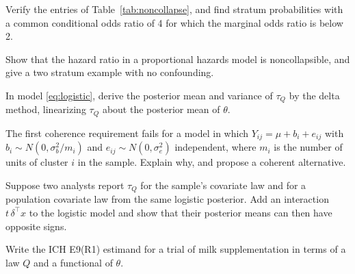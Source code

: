 \begin{exercises}
\item\label{ex:ch02:1} Verify the entries of Table~\ref{tab:noncollapse}, and find stratum probabilities with a common conditional odds ratio of 4 for which the marginal odds ratio is below 2.
\item\label{ex:ch02:2} Show that the hazard ratio in a proportional hazards model is noncollapsible, and give a two stratum example with no confounding.
\item\label{ex:ch02:3} In model \eqref{eq:logistic}, derive the posterior mean and variance of $\tau_Q$ by the delta method, linearizing $\tau_Q$ about the posterior mean of $\theta$.
\item\label{ex:ch02:4} The first coherence requirement fails for a model in which $Y_{ij} = \mu + b_i + e_{ij}$ with $b_i \sim N(0, \sigma_b^2 / m_i)$ and $e_{ij} \sim N(0, \sigma_e^2)$ independent, where $m_i$ is the number of units of cluster $i$ in the sample. Explain why, and propose a coherent alternative.
\item\label{ex:ch02:5} Suppose two analysts report $\tau_Q$ for the sample's covariate law and for a population covariate law from the same logistic posterior. Add an interaction $t\,\delta^\top x$ to the logistic model and show that their posterior means can then have opposite signs.
\item\label{ex:ch02:6} Write the ICH E9(R1) estimand for a trial of milk supplementation in terms of a law $Q$ and a functional of $\theta$.


\end{exercises}
